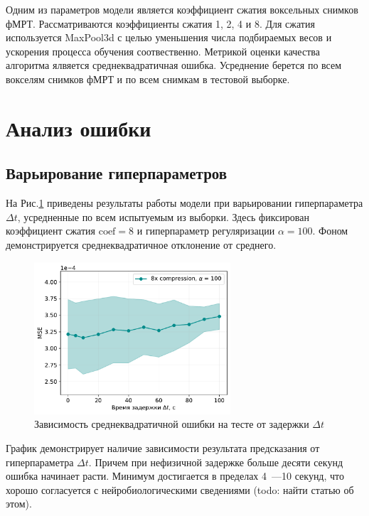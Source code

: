 \documentclass[12pt,twoside]{article}
\begin{document}
Одним из параметров модели является коэффициент сжатия воксельных снимков фМРТ. 
Рассматриваются коэффициенты сжатия 1, 2, 4 и 8.
Для сжатия используется MaxPool3d с целью уменьшения числа подбираемых весов и ускорения процесса обучения соотвественно.
Метрикой оценки качества алгоритма ялвяется среднеквадратичная ошибка.
Усреднение берется по всем вокселям снимков фМРТ и по всем снимкам в тестовой выборке.


\section{Анализ ошибки}
\subsection{Варьирование гиперпараметров}
На Рис.\ref{MSE_dt_main} приведены результаты работы модели при варьировании гиперпараметра $\Delta t$, усредненные по всем испытуемым из выборки. Здесь фиксирован коэффициент сжатия $\mathrm{coef} = 8$ и гиперпараметр регуляризации $\alpha = 100$. Фоном демонстрируется среднеквадратичное отклонение от среднего.
\begin{figure}[h!]
    \centering
    \includegraphics[width=0.65\textwidth]{subs_delta_MSE_dt.pdf}
    \caption{Зависимость среднеквадратичной ошибки на тесте от задержки ${\Delta t}$}
    \label{MSE_dt_main}
\end{figure}
График демонстрирует наличие зависимости результата предсказания от гиперпараметра $\Delta t$. 
Причем при нефизичной задержке больше десяти секунд ошибка начинает расти. 
Минимум достигается в пределах 4~---10 секунд, что хорошо согласуется с нейробиологическими сведениями (todo: найти статью об этом).
\end{document}
